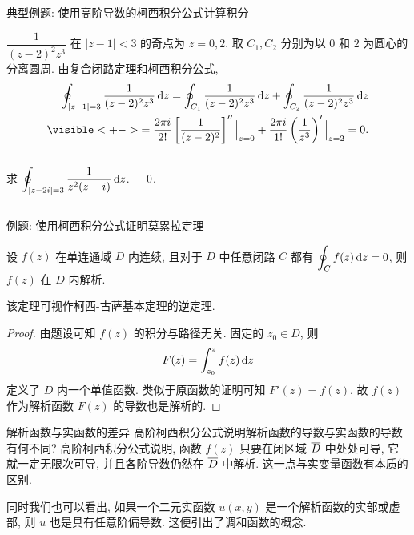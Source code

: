 \begin{frame}[<*>]{典型例题: 使用高阶导数的柯西积分公式计算积分}
\onslide<+->
\begin{solutionc}
 $\dfrac1{(z-2)^2z^3}$ 在 $|z-1|<3$ 的奇点为 $z=0,2$.
\onslide<+->
取 $C_1,C_2$ 分别为以 $0$ 和 $2$ 为圆心的分离圆周.
\onslide<+->
由复合闭路定理和柯西积分公式,
\onslide<+->
\begin{align*}
&\peq\oint_{|z-1|=3}\frac1{(z-2)^2z^3}\diff z=\oint_{C_1}\frac1{(z-2)^2z^3}\diff z+\oint_{C_2}\frac1{(z-2)^2z^3}\diff z\\
&\visible<+->{=\frac{2\pi i}{2!}\left[\frac1{(z-2)^2}\right]''\Big|_{z=0}+\frac{2\pi i}{1!}\left(\frac1{z^3}\right)'\Big|_{z=2}=0.}
\end{align*}
\end{solutionc}
\onslide<+->
\begin{columns}
		\begin{exercise}
		求 $\displaystyle\oint_{|z-2i|=3}\frac1{z^2(z-i)}\,\mathrm{d} z$.
		\end{exercise}\onslide<+->
		\begin{answer}
		$0\vphantom{\displaystyle\oint_{|z-2i|=3}\frac1{z^2(z-i)}\diff z}$.
		\end{answer}
\end{columns}
\end{frame}


\begin{frame}{例题: 使用柯西积分公式证明莫累拉定理}
\begin{example}[莫累拉定理]
设 $f(z)$ 在单连通域 $D$ 内连续, 且对于 $D$ 中任意闭路 $C$ 都有 $\displaystyle\oint_Cf(z)\,\mathrm{d} z=0$, 则 $f(z)$ 在 $D$ 内解析.
\end{example}
\onslide<+->
该定理可视作柯西-古萨基本定理的逆定理.
\begin{proof}
由题设可知 $f(z)$ 的积分与路径无关.
\onslide<+->
固定的 $z_0\in D$, 则
\[F(z)=\int_{z_0}^zf(z)\,\mathrm{d} z\]
定义了 $D$ 内一个单值函数.
\onslide<+->
类似于原函数的证明可知 $F'(z)=f(z)$.
\onslide<+->
故 $f(z)$ 作为解析函数 $F(z)$ 的导数也是解析的.
\end{proof}
\end{frame}


\begin{frame}{解析函数与实函数的差异}
\onslide<+->
高阶柯西积分公式说明解析函数的导数与实函数的导数有何不同?
\onslide<+->
高阶柯西积分公式说明, 函数 $f(z)$ 只要在闭区域 $\overline D$ 中处处可导, 它就一定无限次可导, 并且各阶导数仍然在 $\overline D$ 中解析.
\onslide<+->
\alert{这一点与实变量函数有本质的区别.}

\onslide<+->
同时我们也可以看出, 如果一个二元实函数 $u(x,y)$ 是一个解析函数的实部或虚部, 则 $u$ 也是具有任意阶偏导数.
\onslide<+->
这便引出了调和函数的概念.
\end{frame}


